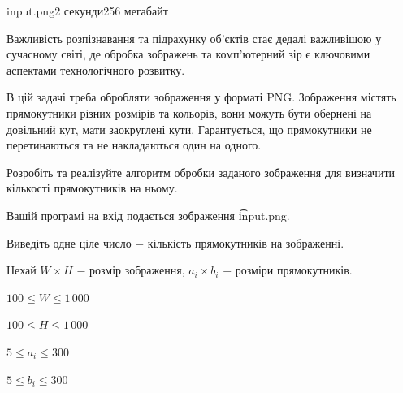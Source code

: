 \begin{problem}{}{input.png}{}{2 секунди}{256 мегабайт}

Важливість розпізнавання та підрахунку об'єктів стає дедалі важливішою у сучасному світі, 
де обробка зображень та комп'ютерний зір є ключовими аспектами технологічного розвитку.

В цій задачі треба обробляти зображення у форматі PNG.
Зображення містять прямокутники різних розмірів та кольорів, вони можуть бути обернені на довільний кут, мати заокруглені кути.
Гарантується, що прямокутники не перетинаються та не накладаються один на одного. 

Розробіть та реалізуйте алгоритм обробки заданого зображення для визначити кількості прямокутників на ньому.

\InputFile
Вашій програмі на вхід подається зображення \t{input.png}. 

\OutputFile
Виведіть одне ціле число $-$ кількість прямокутників на зображенні.

\Constraints
Нехай $W \times H$ $-$ розмір зображення, $a_i \times b_i$ $-$ розміри прямокутників.

$100 \le W \le 1\,000$

$100 \le H \le 1\,000$

$5 \le a_i \le 300$

$5 \le b_i \le 300$



\end{problem}
